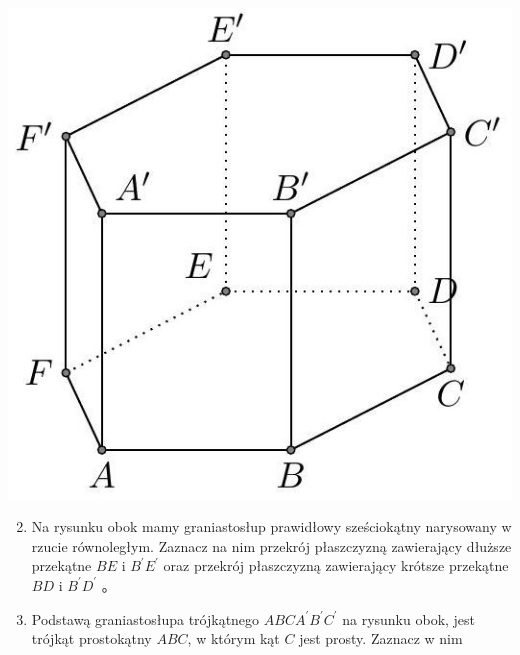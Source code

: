 \documentclass[10pt]{article}
\begin{document}
\begin{itemize}
\includegraphics[max width=\textwidth, center]{2024_11_21_e9b4faa005d5be2cc318g-078}
\end{itemize}

\begin{enumerate}
  \setcounter{enumi}{1}
  \item Na rysunku obok mamy graniastosłup prawidłowy sześciokątny narysowany w rzucie równoległym. Zaznacz na nim przekrój płaszczyzną zawierający dłuższe przekątne \(B E\) i \(B^{\prime} E^{\prime}\) oraz przekrój płaszczyzną zawierający krótsze przekątne \(B D\) i \(B^{\prime} D^{\prime}\) 。
  \item Podstawą graniastosłupa trójkątnego \(A B C A^{\prime} B^{\prime} C^{\prime}\) na rysunku obok, jest trójkąt prostokątny \(A B C\), w którym kąt \(C\) jest prosty. Zaznacz w nim
\end{enumerate}
\end{document}
